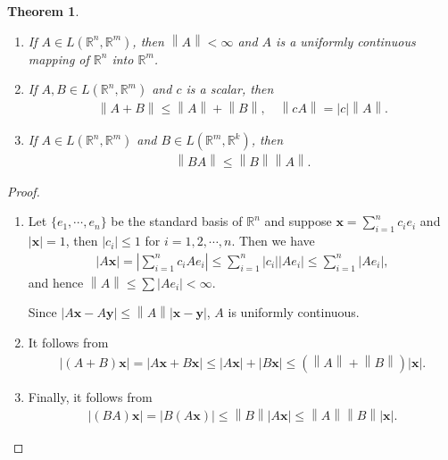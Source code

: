 \documentclass[11pt]{book}
\newtheorem{theorem}{Theorem}[chapter]
\theoremstyle{definition}
\numberwithin{equation}{chapter}
\begin{document}
\medskip

\begin{theorem}
~\begin{enumerate}[label=(\alph*)]
    \item If $A \in L(\mathbb{R}^n,\mathbb{R}^m)$, then $\left\|A\right\| < \infty$ and $A$ is a uniformly continuous mapping of $\mathbb{R}^n$ into $\mathbb{R}^m$.
    
    \item If $A, B \in L(\mathbb{R}^n,\mathbb{R}^m)$ and $c$ is a scalar, then
    \begin{align*}
        \left\|A + B\right\| \leq \left\|A\right\| + \left\|B\right\|, \quad \left\|cA\right\| = \left|c\right| \left\|A\right\|.
    \end{align*}
    
    \item If $A \in L(\mathbb{R}^n,\mathbb{R}^m)$ and $B \in L(\mathbb{R}^m,\mathbb{R}^k)$, then
    \begin{align*}
        \left\|BA\right\| \leq \left\|B\right\| \left\|A\right\|.
    \end{align*}
\end{enumerate}
\end{theorem}


\begin{proof}
~\begin{enumerate}[label=(\alph*)]
    \item Let $\{e_1, \cdots, e_n\}$ be the standard basis of $\mathbb{R}^n$ and suppose $\mathbf{x} = \sum^n_{i=1} c_i e_i$ and $\left|\mathbf{x}\right| = 1$, then $\left|c_i\right| \leq 1$ for $i = 1,2,\cdots,n$. Then we have
    \begin{align*}
        \left|A\mathbf{x}\right| = \left|\sum^n_{i=1} c_i Ae_i\right| \leq \sum^n_{i=1} \left|c_i\right| \left|A e_i\right| \leq \sum^n_{i=1} \left|A e_i\right|,
    \end{align*}
    and hence $\left\|A\right\| \leq \sum \left|A e_i\right| < \infty$. 
    
    Since $\left|A\mathbf{x} - A\mathbf{y}\right| \leq \left\|A\right\| \left|\mathbf{x} - \mathbf{y}\right|$, $A$ is uniformly continuous.
    
    \item It follows from
    \begin{align*}
        \left|(A+B)\mathbf{x}\right| = \left|A\mathbf{x} + B\mathbf{x}\right| \leq \left|A\mathbf{x}\right| + \left|B\mathbf{x}\right| \leq \left(\left\|A\right\| + \left\|B\right\|\right) \left|\mathbf{x}\right|.
    \end{align*}
    
    \item Finally, it follows from
    \begin{align*}
        \left|(BA)\mathbf{x}\right| = \left|B(A\mathbf{x})\right| \leq \left\|B\right\| \left|A\mathbf{x}\right| \leq \left\|A\right\| \left\|B\right\| \left|\mathbf{x}\right|.
    \end{align*}
\end{enumerate}
\end{proof}
\end{document}
